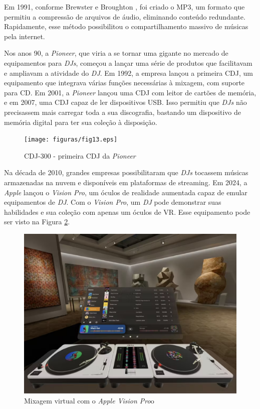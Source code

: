 Em 1991, conforme Brewster e Broughton \cite{lastnight}, foi criado o MP3, um formato que permitiu a compressão de arquivos de áudio, eliminando conteúdo redundante. Rapidamente, esse método possibilitou o compartilhamento massivo de músicas pela internet.

Nos anos 90, a \textit{Pioneer}, que viria a se tornar uma gigante no mercado de equipamentos para \textit{DJs}, começou a lançar uma série de produtos que facilitavam e ampliavam a atividade do \textit{DJ}. Em 1992, a empresa lançou a primeira CDJ, um equipamento que integrava várias funções necessárias à mixagem, com suporte para CD. Em 2001, a \textit{Pioneer} lançou uma CDJ com leitor de cartões de memória, e em 2007, uma CDJ capaz de ler dispositivos USB. Isso permitiu que \textit{DJs} não precisassem mais carregar toda a sua discografia, bastando um dispositivo de memória digital para ter sua coleção à disposição.

\begin{figure}[h]
	\centering
    \texttt{[image: figuras/fig13.eps]}
	\caption{CDJ-300 - primeira CDJ da \textit{Pioneer} \cite{cdj300}}
	\label{fig13}
\end{figure}

Na década de 2010, grandes empresas possibilitaram que \textit{DJs} tocassem músicas armazenadas na nuvem e disponíveis em plataformas de streaming. Em 2024, a \textit{Apple} lançou o \textit{Vision Pro}, um óculos de realidade aumentada capaz de emular equipamentos de \textit{DJ}. Com o \textit{Vision Pro}, um \textit{DJ} pode demonstrar suas habilidades e sua coleção com apenas um óculos de VR. Esse equipamento pode ser visto na Figura \ref{fig16}.

\begin{figure}[h]
	\centering
    \includegraphics[scale=0.3]{figuras/fig16.eps}
	\caption{Mixagem virtual com o \textit{Apple Vision Pro}o \cite{macmagazineDesenvolvedorFala}}
	\label{fig16}
\end{figure}


